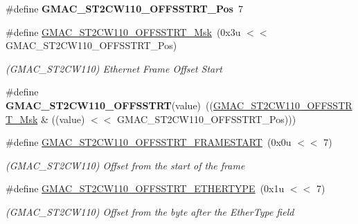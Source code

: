 \begin{DoxyCompactItemize}
\item 
\mbox{\label{group__SAMV71__GMAC_ga1fcd0f409d053ae1ae513e3f69c5aafc}} 
\#define {\bfseries G\+M\+A\+C\+\_\+\+S\+T2\+C\+W110\+\_\+\+O\+F\+F\+S\+S\+T\+R\+T\+\_\+\+Pos}~7
\item 
\mbox{\label{group__SAMV71__GMAC_ga56bc4b2fdaf040360d2e104b1b2970b0}} 
\#define \mbox{\hyperlink{group__SAMV71__GMAC_ga56bc4b2fdaf040360d2e104b1b2970b0}{G\+M\+A\+C\+\_\+\+S\+T2\+C\+W110\+\_\+\+O\+F\+F\+S\+S\+T\+R\+T\+\_\+\+Msk}}~(0x3u $<$$<$ G\+M\+A\+C\+\_\+\+S\+T2\+C\+W110\+\_\+\+O\+F\+F\+S\+S\+T\+R\+T\+\_\+\+Pos)
\begin{DoxyCompactList}\small\item\em (G\+M\+A\+C\+\_\+\+S\+T2\+C\+W110) Ethernet Frame Offset Start \end{DoxyCompactList}\item 
\mbox{\label{group__SAMV71__GMAC_gaabfd0899f29162f9417c033b3b64047a}} 
\#define {\bfseries G\+M\+A\+C\+\_\+\+S\+T2\+C\+W110\+\_\+\+O\+F\+F\+S\+S\+T\+RT}(value)~((\mbox{\hyperlink{group__SAMV71__GMAC_ga56bc4b2fdaf040360d2e104b1b2970b0}{G\+M\+A\+C\+\_\+\+S\+T2\+C\+W110\+\_\+\+O\+F\+F\+S\+S\+T\+R\+T\+\_\+\+Msk}} \& ((value) $<$$<$ G\+M\+A\+C\+\_\+\+S\+T2\+C\+W110\+\_\+\+O\+F\+F\+S\+S\+T\+R\+T\+\_\+\+Pos)))
\item 
\mbox{\label{group__SAMV71__GMAC_gac52a8f82174d3fdf82217b9f07a76d2c}} 
\#define \mbox{\hyperlink{group__SAMV71__GMAC_gac52a8f82174d3fdf82217b9f07a76d2c}{G\+M\+A\+C\+\_\+\+S\+T2\+C\+W110\+\_\+\+O\+F\+F\+S\+S\+T\+R\+T\+\_\+\+F\+R\+A\+M\+E\+S\+T\+A\+RT}}~(0x0u $<$$<$ 7)
\begin{DoxyCompactList}\small\item\em (G\+M\+A\+C\+\_\+\+S\+T2\+C\+W110) Offset from the start of the frame \end{DoxyCompactList}\item 
\mbox{\label{group__SAMV71__GMAC_gaa90c687911d45b379c7b15cda1eb62db}} 
\#define \mbox{\hyperlink{group__SAMV71__GMAC_gaa90c687911d45b379c7b15cda1eb62db}{G\+M\+A\+C\+\_\+\+S\+T2\+C\+W110\+\_\+\+O\+F\+F\+S\+S\+T\+R\+T\+\_\+\+E\+T\+H\+E\+R\+T\+Y\+PE}}~(0x1u $<$$<$ 7)
\begin{DoxyCompactList}\small\item\em (G\+M\+A\+C\+\_\+\+S\+T2\+C\+W110) Offset from the byte after the Ether\+Type field \end{DoxyCompactList}\item 

\end{DoxyCompactItemize}
